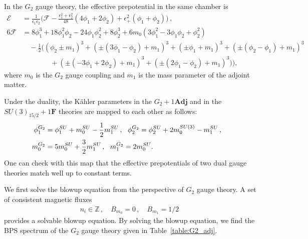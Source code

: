 In the $G_2$ gauge theory, the effective prepotential in the same chamber is
\begin{align}
\mathcal{E} &= \frac{1}{\epsilon_1 \epsilon_2} \bigg( \mathcal{F} - \frac{\epsilon_1^2 + \epsilon_2^2}{48} (4\phi_1 + 2\phi_2) + \epsilon_+^2 (\phi_1 + \phi_2)\bigg) \,, \nonumber \\
6\mathcal{F}
&= 8\phi_1^3 + 18\phi_1^2 \phi_2 - 24\phi_1 \phi_2^2 + 8\phi_2^3 + 6m_0 (3\phi_1^2 - 3\phi_1 \phi_2 + \phi_2^2) \nonumber \\
& \quad -\frac{1}{2} \big((\phi_2 \pm m_1)^3 + (\pm(3\phi_1 - \phi_2) + m_1)^3 + (\pm \phi_1 + m_1)^3 + (\pm(\phi_2 - \phi_1) + m_1)^3 \nonumber \\
& \qquad \qquad + (\pm(-3\phi_1 + 2\phi_2) + m_1)^3 + (\pm(2\phi_1 - \phi_2) + m_1)^3) \big),
\end{align}
where $m_0$ is the $G_2$ gauge coupling and $m_1$ is the mass parameter of the adjoint matter. 

Under the duality, the K\"ahler parameters in the $ G_2 + 1\mathbf{Adj} $ and in the $ SU(3)_{15/2} + 1\mathbf{F} $ theories are mapped to each other as follows:
\begin{align}\label{eq:G2adj-su3+1f_map}
\phi_1^{G_2} &= \phi_1^{SU} + m_0^{SU} - \frac{1}{2} m_1^{SU} \,, \ \ \phi_2^{G_2} = \phi_2^{SU} + 2m_0^{SU(3)} - m_1^{SU} \,, \cr 
m_0^{G_2} &= 5m_0^{SU} + \frac{3}{2}m_1^{SU} \,, \ \ m_1^{G_2} = 2m_0^{SU}.
\end{align}
One can check with this map that the effective prepotentials of two dual gauge theories match well up to constant terms.

We first solve the blowup equation from the perspective of $ G_2 $ gauge theory. A set of consistent magnetic fluxes 
\begin{align}\label{eq:G2_adj_flux}
n_i \in \mathbb{Z} \, , \quad
B_{m_0} = 0 \, , \quad
B_{m_1} = 1/2 \ 
\end{align}
provides a solvable blowup equation.
By solving the blowup equation, we find the BPS spectrum of the $G_2$ gauge theory given in Table~\ref{table:G2_adj}.

